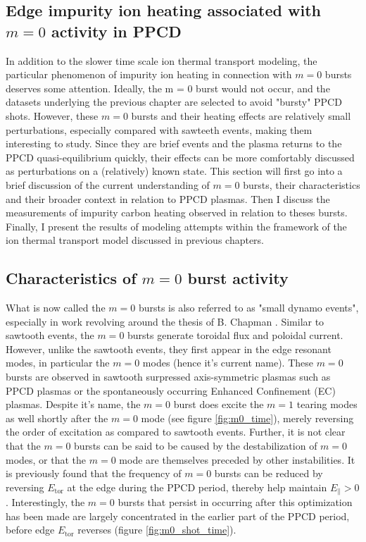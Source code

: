 \begin{refsection}

\chapter{Edge impurity ion heating associated with $m = 0$ activity in PPCD}\label{ch:m0}

In addition to the slower time scale ion thermal transport modeling, the particular phenomenon of impurity ion heating in connection with $m = 0$ bursts deserves some attention. Ideally, the m = 0 burst would not occur, and the datasets underlying the previous chapter are selected to avoid "bursty" PPCD shots. However, these $m = 0$ bursts and their heating effects are relatively small perturbations, especially compared with sawteeth events, making them interesting to study. Since they are brief events and the plasma returns to the PPCD quasi-equilibrium quickly, their effects can be more comfortably discussed as perturbations on a (relatively) known state. This section will first go into a brief discussion of the current understanding of $m = 0$ bursts, their characteristics and their broader context in relation to PPCD plasmas. Then I discuss the measurements of impurity carbon heating observed in relation to theses bursts. Finally, I present the results of modeling attempts within the framework of the ion thermal transport model discussed in previous chapters.

\section{Characteristics of $m = 0$ burst activity}
What is now called the $m = 0$ bursts is also referred to as "small dynamo events", especially in work revolving around the thesis of B. Chapman \cite{Chapman1997}. Similar to sawtooth events, the $m = 0$ bursts generate toroidal flux and poloidal current. However, unlike the sawtooth events, they first appear in the edge resonant modes, in particular the $m = 0$ modes (hence it's current name). These $m = 0$ bursts are observed in sawtooth surpressed axis-symmetric plasmas such as PPCD plasmas or the spontaneously occurring Enhanced Confinement (EC) plasmas. Despite it's name, the $m = 0$ burst does excite the $m = 1$ tearing modes as well shortly after the $m = 0$ mode (see figure \ref{fig:m0_time}), merely reversing the order of excitation as compared to sawtooth events. Further, it is not clear that the $m = 0$ bursts can be said to be caused by the destabilization of $m = 0$ modes, or that the $m = 0$ mode are themselves preceded by other instabilities. It is previously found that the frequency of $m = 0$ bursts can be reduced by reversing $E_{\text{tor}}$ at the edge during the PPCD period, thereby help maintain $E_\parallel > 0$\cite{Chapman2001}. Interestingly, the $m = 0$ bursts that persist in occurring after this optimization has been made are largely concentrated in the earlier part of the PPCD period, before edge $E_{\text{tor}}$ reverses (figure \ref{fig:m0_shot_time}).


\end{refsection}

